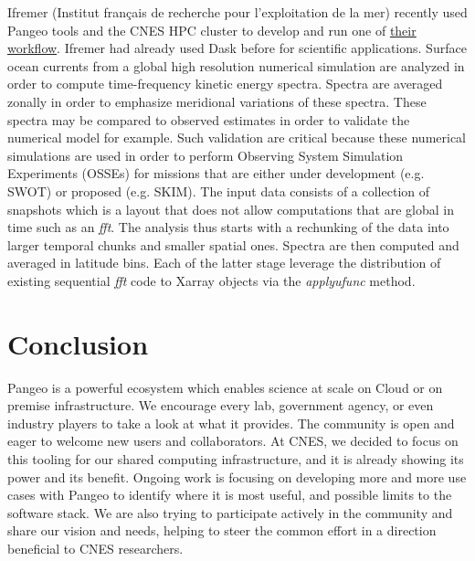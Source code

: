 \documentclass{article}
\begin{document}
Ifremer (Institut français de recherche pour l'exploitation de la mer) recently used 
Pangeo tools and the CNES HPC cluster to develop and run one of 
\href{https://github.com/apatlpo/mit_equinox/blob/master/hal/rechunk_rotspectra.ipynb}{their workflow}. Ifremer had already used Dask before for scientific applications\cite{b9}.
Surface ocean currents from a global high resolution numerical simulation are analyzed in order to compute time-frequency kinetic energy spectra.
Spectra are averaged zonally in order to emphasize meridional variations of these spectra.
These spectra may be compared to observed estimates in order to validate the numerical model for example.
Such validation are critical because these numerical simulations are used in order to perform Observing System Simulation Experiments (OSSEs) for missions that are either under development (e.g. SWOT) or proposed (e.g. SKIM).
The input data consists of a collection of snapshots which is a layout that does not allow computations that are global in time such as an \textit{fft}.
The analysis thus starts with a rechunking of the data into larger temporal chunks and smaller spatial ones.
Spectra are then computed and averaged in latitude bins.
Each of the latter stage leverage the distribution of existing sequential \textit{fft} code to Xarray objects via the \textit{apply\textunderscore ufunc} method.


\section{Conclusion}
\label{sec:conclusion}

Pangeo is a powerful ecosystem which enables science at scale on Cloud or on premise infrastructure. We encourage every lab, government agency, or even industry players to take a look at what it provides. The community is open and eager to welcome new users and collaborators.
At CNES, we decided to focus on this tooling for our shared computing infrastructure, and it is already showing its power and its benefit. Ongoing work is focusing on developing more and more use cases with Pangeo to identify where it is most useful, and possible limits to the software stack. We are also trying to participate actively in the community and share our vision and needs, helping to steer the common effort in a direction beneficial to CNES researchers.

\end{document}
